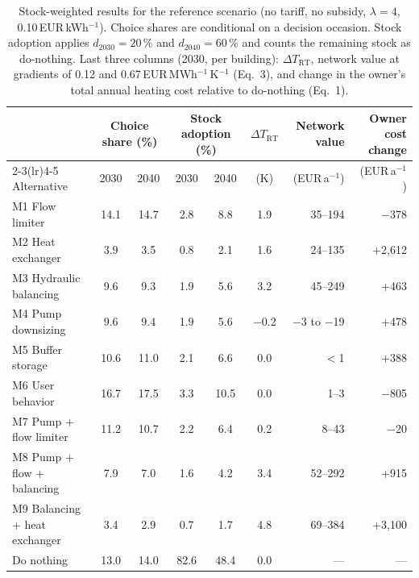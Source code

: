 \begin{table}[htbp]
\centering
\caption{Stock-weighted results for the reference scenario (no tariff, no subsidy, $\lambda=4$, 0.10\,EUR\,kWh$^{-1}$). Choice shares are conditional on a decision occasion. Stock adoption applies $d_{2030}=20\,\%$ and $d_{2040}=60\,\%$ and counts the remaining stock as do-nothing. Last three columns (2030, per building): $\Delta T_{\mathrm{RT}}$, network value at gradients of 0.12 and 0.67\,EUR\,MWh$^{-1}$\,K$^{-1}$ (Eq.~3), and change in the owner's total annual heating cost relative to do-nothing (Eq.~1).}
\label{tab:mainresults}
\footnotesize
\setlength{\tabcolsep}{4pt}
\begin{tabular}{lcccccrr}
\toprule
 & \multicolumn{2}{c}{Choice share (\%)} & \multicolumn{2}{c}{Stock adoption (\%)} & $\Delta T_{\mathrm{RT}}$ & Network value & Owner cost change \\
\cmidrule(lr){2-3}\cmidrule(lr){4-5}
Alternative & 2030 & 2040 & 2030 & 2040 & (K) & (EUR\,a$^{-1}$) & (EUR\,a$^{-1}$) \\
\midrule
M1 Flow limiter & 14.1 & 14.7 & 2.8 & 8.8 & 1.9 & 35--194 & $-$378 \\
M2 Heat exchanger & 3.9 & 3.5 & 0.8 & 2.1 & 1.6 & 24--135 & +2,612 \\
M3 Hydraulic balancing & 9.6 & 9.3 & 1.9 & 5.6 & 3.2 & 45--249 & +463 \\
M4 Pump downsizing & 9.6 & 9.4 & 1.9 & 5.6 & $-$0.2 & $-$3 to $-$19 & +478 \\
M5 Buffer storage & 10.6 & 11.0 & 2.1 & 6.6 & 0.0 & $<$1 & +388 \\
M6 User behavior & 16.7 & 17.5 & 3.3 & 10.5 & 0.0 & 1--3 & $-$805 \\
M7 Pump + flow limiter & 11.2 & 10.7 & 2.2 & 6.4 & 0.2 & 8--43 & $-$20 \\
M8 Pump + flow + balancing & 7.9 & 7.0 & 1.6 & 4.2 & 3.4 & 52--292 & +915 \\
M9 Balancing + heat exchanger & 3.4 & 2.9 & 0.7 & 1.7 & 4.8 & 69--384 & +3,100 \\
Do nothing & 13.0 & 14.0 & 82.6 & 48.4 & 0.0 & --- & --- \\
\bottomrule
\end{tabular}
\end{table}
